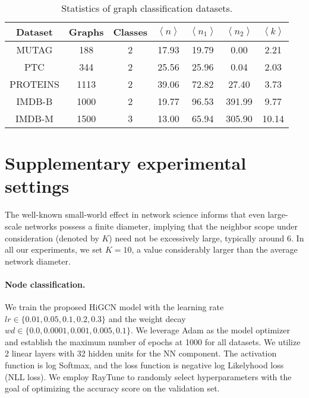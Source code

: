 \documentclass[letterpaper]{article} \usepackage{aaai24}
\theoremstyle{plain}
\theoremstyle{definition}
\theoremstyle{remark}
\begin{document}
\begin{table*}[htbp]
\centering
\begin{tabular}{ccccccc}
\toprule
Dataset   
& Graphs
& Classes   
& $\left \langle n \right \rangle$ 
& $\left \langle n_1 \right \rangle$ 
& $\left \langle n_2 \right \rangle$ 
& $\left \langle k \right \rangle$ \\  \midrule
MUTAG       & 188   & 2     & 17.93     & 19.79     & 0.00     &2.21\\
PTC         & 344   & 2     & 25.56     & 25.96     & 0.04  &2.03\\
PROTEINS    & 1113  & 2     & 39.06     & 72.82     & 27.40  & 3.73        \\
IMDB-B      & 1000  & 2     & 19.77     & 96.53     & 391.99 & 9.77\\
IMDB-M      & 1500  & 3     & 13.00     & 65.94     & 305.90 & 10.14\\
\bottomrule
\end{tabular}
\caption{Statistics of graph classification datasets.}
\label{tab:graph_datasets}
\end{table*}


\section{Supplementary experimental settings}
\label{appendix: exp_setting}


The well-known small-world effect \cite{SmallWorld1967} in network science informs that even large-scale networks possess a finite diameter, implying that the neighbor scope under consideration (denoted by $K$) need not be excessively large, typically around 6. In all our experiments, we set $K=10$, a value considerably larger than the average network diameter.


\paragraph{Node classification.}
We train the proposed HiGCN model with the learning rate $lr \in \{0.01, 0.05, 0.1, 0.2, 0.3\}$ and the weight decay $wd \in \{0.0, 0.0001, 0.001, 0.005, 0.1\}$.
We leverage Adam as the model optimizer and establish the maximum number of epochs at 1000 for all datasets. 
We utilize 2 linear layers with 32 hidden units for the NN component. 
The activation function is log Softmax, and the loss function is negative log Likelyhood loss (NLL loss). 
We employ RayTune to randomly select hyperparameters with the goal of optimizing the accuracy score on the validation set.
\end{document}
